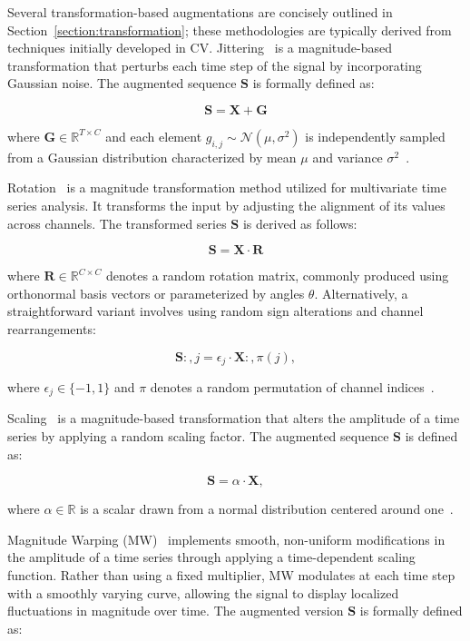 Several transformation-based augmentations are concisely outlined in Section~\ref{section:transformation}; these methodologies are typically derived from techniques initially developed in CV. Jittering~\cite{Um_2017} is a magnitude-based transformation that perturbs each time step of the signal by incorporating Gaussian noise. The augmented sequence $\mathbf{S}$ is formally defined as:

\[ \mathbf{S} = \mathbf{X} + \mathbf{G} \]

where $\mathbf{G} \in \mathbb{R}^{T \times C}$ and each element $g_{i,j} \sim \mathcal{N}(\mu, \sigma^2)$ is independently sampled from a Gaussian distribution characterized by mean $\mu$ and variance $\sigma^2$~\cite{10.1371/journal.pone.0315343, 10.1371/journal.pone.0254841}.

Rotation~\cite{10.1371/journal.pone.0254841} is a magnitude transformation method utilized for multivariate time series analysis. It transforms the input by adjusting the alignment of its values across channels. The transformed series $\mathbf{S}$ is derived as follows:

\[ \mathbf{S} = \mathbf{X} \cdot \mathbf{R} \]

where $\mathbf{R} \in \mathbb{R}^{C \times C}$ denotes a random rotation matrix, commonly produced using orthonormal basis vectors or parameterized by angles $\theta$. Alternatively, a straightforward variant involves using random sign alterations and channel rearrangements:

\[ \mathbf{S}{:, j} = \epsilon_j \cdot \mathbf{X}{:, \pi(j)}, \]

where $\epsilon_j \in \{-1, 1\}$ and $\pi$ denotes a random permutation of channel indices~\cite{10.1371/journal.pone.0315343}.

Scaling~\cite{Um_2017} is a magnitude-based transformation that alters the amplitude of a time series by applying a random scaling factor. The augmented sequence $\mathbf{S}$ is defined as:

\[ \mathbf{S} = \alpha \cdot \mathbf{X},  \]

where $\alpha \in \mathbb{R}$ is a scalar drawn from a normal distribution centered around one~\cite{10.1371/journal.pone.0254841}.





Magnitude Warping (MW)~\cite{10.1371/journal.pone.0254841} implements smooth, non-uniform modifications in the amplitude of a time series through applying a time-dependent scaling function. Rather than using a fixed multiplier, MW modulates at each time step with a smoothly varying curve, allowing the signal to display localized fluctuations in magnitude over time. The augmented version $\mathbf{S}$ is formally defined as:

